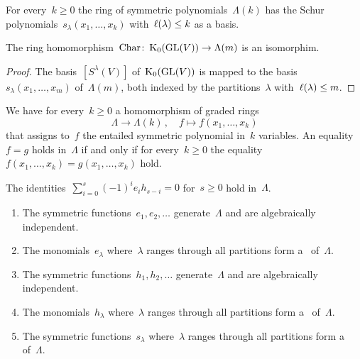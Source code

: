\documentclass[a4paper,10pt]{scrartcl}
\begin{document}
\begin{proposition}
  For every~$k \geq 0$ the ring of symmetric polynomials~$\Lambda(k)$ has the Schur polynomials~$s_\lambda(x_1, \dotsc, x_k)$ with~$\operatorname{\ell}(\lambda) \leq k$ as a basis.
\end{proposition}

\begin{corollary}
  The ring homomorphism~$\operatorname{Char} \colon \operatorname{K}_0(\operatorname{GL}(V)) \to \Lambda(m)$ is an isomorphim.
\end{corollary}

\begin{proof}
  The basis~$[S^\lambda(V)]$ of~$\operatorname{K}_0(\operatorname{GL}(V))$ is mapped to the basis~$s_\lambda(x_1, \dotsc, x_m)$ of~$\Lambda(m)$, both indexed by the partitions~$\lambda$ with~$\operatorname{\ell}(\lambda) \leq m$.
\end{proof}

We have for every~$k \geq 0$ a homomorphism of graded rings
\[
  \Lambda
  \to
  \Lambda(k) \,,
  \quad
  f
  \mapsto
  f(x_1, \dotsc, x_k)
\]
that assigns to~$f$ the entailed symmetric polynomial in~$k$ variables.
An equality~$f = g$ holds in~$\Lambda$ if and only if for every~$k \geq 0$ the equality~$f(x_1, \dotsc, x_k) = g(x_1, \dotsc, x_k)$ hold.

\begin{example}
  The identities~$\sum_{i=0}^s (-1)^i e_i h_{s-i} = 0$ for~$s \geq 0$ hold in~$\Lambda$.
\end{example}

\begin{proposition}
  \leavevmode
  \begin{enumerate}
    \item
      The symmetric functions~$e_1, e_2, \dotsc$ generate~$\Lambda$ and are algebraically independent.
    \item
      The monomials~$e_\lambda$ where~$\lambda$ ranges through all partitions form a~{\basis{$\Integer$}} of~$\Lambda$.
    \item
      The symmetric functions~$h_1, h_2, \dotsc$ generate~$\Lambda$ and are algebraically independent.
    \item
      The monomials~$h_\lambda$ where~$\lambda$ ranges through all partitions form a~{\basis{$\Integer$}} of~$\Lambda$.
    \item
      The symmetric functions~$s_\lambda$ where~$\lambda$ ranges through all partitions form a~{\basis{$\Integer$}} of~$\Lambda$.
  \end{enumerate}
\end{proposition}
\end{document}
